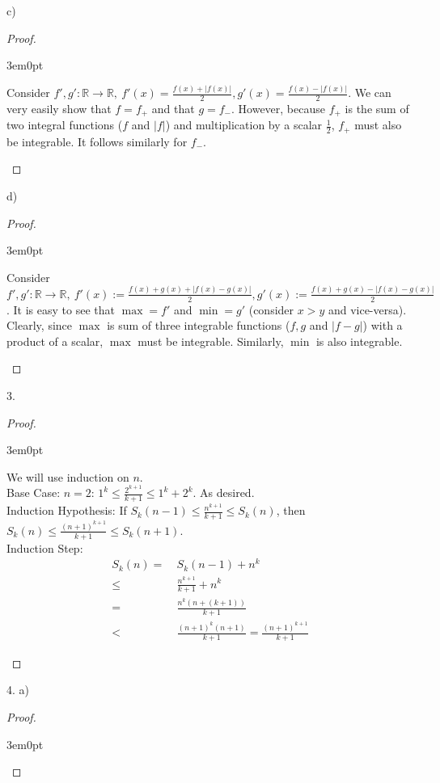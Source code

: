 \documentclass[11pt]{article}
\newcommand{\R}{\mathbb{R}}
\newenvironment{myproof}
{\begin{proof} \begin{adjustwidth}{3em}{0pt}$ $\par\nobreak\ignorespaces}
{\end{adjustwidth} \end{proof}}
\begin{document}
\begin{flushleft}
c)

\begin{myproof}

Consider $f',g': \R \to \R, \ f'(x)= \frac{f(x)+|f(x)|}{2}, g'(x) = \frac{f(x)-|f(x)|}{2}$. We can very easily show that $f = f_+$ and that $g = f_-$. However, because $f_+$ is the sum of two integral functions ($f$ and $|f|$) and multiplication by a scalar $\frac12$, $f_+$ must also be integrable. It follows similarly for $f_-$.

\end{myproof}

d)

\begin{myproof}

Consider $f',g': \R \to \R, \ f'(x) := \frac{f(x)+g(x)+|f(x)-g(x)|}{2}, g'(x) := \frac{f(x)+g(x)-|f(x)-g(x)|}{2}$. It is easy to see that $\max = f'$ and $\min = g'$ (consider $x>y$ and vice-versa). Clearly, since $\max$ is sum of three integrable functions ($f,g$ and $|f-g|$) with a product of a scalar, $\max$ must be integrable. Similarly, $\min$ is also integrable.

\end{myproof}

\newpage

3.

\begin{myproof}

We will use induction on $n$. \\
Base Case: $n = 2$: $1^k \leq \frac{2^{k+1}}{k+1} \leq 1^k + 2^k$. As desired. \\
Induction Hypothesis: If $S_k(n-1) \leq \frac{n^{k+1}}{k+1} \leq S_k(n)$, then $S_k(n) \leq \frac{(n+1)^{k+1}}{k+1} \leq S_k(n+1)$. \\
Induction Step:
\begin{align*}
S_k(n) = &  \ S_k(n-1) + n^k \\
\leq & \ \frac{n^{k+1}}{k+1} + n^k \\
= & \ \frac{n^k(n+(k+1))}{k+1} \\
< & \ \frac{(n+1)^k(n+1)}{k+1} = \frac{(n+1)^{k+1}}{k+1}
\end{align*}

\end{myproof}

\newpage

4. a)

\begin{myproof}


\end{myproof}
\end{flushleft}
\end{document}
